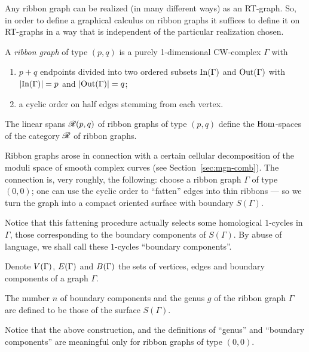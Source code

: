 Any ribbon graph can be realized (in many different ways) as an
RT-graph. So, in order to define a graphical calculus on ribbon graphs
it suffices to define it on RT-graphs in a way that is independent of
the particular realization chosen.

\begin{definition}\label{dfn:ribbon-graphs}
  A \emph{ribbon graph} of type $(p,q)$ is a purely 1-dimensional
  CW-complex $\Gamma$ with 
  \begin{enumerate}
  \item $p+q$ endpoints divided into two ordered subsets $\operatorname{In}(\Gamma)$ and
    $\operatorname{Out}(\Gamma)$ with $\lvert\operatorname{In}(\Gamma)\rvert=p$ and $\lvert\operatorname{Out}(\Gamma)\rvert=q$;
  \item a cyclic order on half edges stemming from each vertex.
  \end{enumerate}
  The linear spans $\mathscr{R}(p,q)$ of ribbon graphs of type $(p,q)$ define the
  $\operatorname{Hom}$-spaces of the category $\mathscr{R}$ of ribbon graphs.
\end{definition}%

Ribbon graphs arose in connection with a certain cellular
decomposition of the moduli space of smooth complex curves (see
Section~\ref{sec:mgn-comb}). The connection is, very roughly, the following:
choose a ribbon graph $\Gamma$ of type $(0,0)$; one can use the cyclic
order to ``fatten'' edges into thin ribbons --- so we turn the graph
into a compact oriented surface with boundary $S(\Gamma)$.

Notice that this fattening procedure actually selects some homological
$1$-cycles in $\Gamma$, those corresponding to the boundary components
of $S(\Gamma)$. By abuse of language, we shall call these $1$-cycles
``boundary components''.

Denote $V(\Gamma)$, $E(\Gamma)$ and $B(\Gamma)$ the
sets of vertices, edges and boundary components of a graph $\Gamma$.

The number $n$ of boundary components and the genus $g$ of the ribbon
graph $\Gamma$ are defined to be those of the surface $S(\Gamma)$.
\begin{remark}
  Notice that the above construction, and the definitions of ``genus''
  and ``boundary components'' are meaningful only for ribbon graphs of
  type $(0,0)$.
\end{remark}


